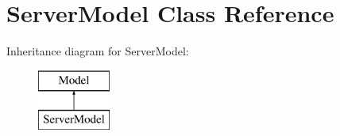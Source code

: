 \hypertarget{classServerModel}{\section{Server\-Model Class Reference}
\label{classServerModel}
}
Inheritance diagram for Server\-Model\-:\begin{figure}[H]
\begin{center}
\leavevmode
\includegraphics[height=2.000000cm]{classServerModel}
\end{center}
\end{figure}
